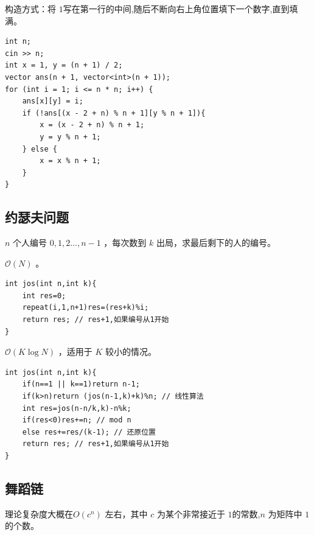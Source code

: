 构造方式：将 $1$写在第一行的中间,随后不断向右上角位置填下一个数字,直到填满。
\begin{lstlisting}[caption={}]
int n;
cin >> n;
int x = 1, y = (n + 1) / 2;
vector ans(n + 1, vector<int>(n + 1));
for (int i = 1; i <= n * n; i++) {
    ans[x][y] = i;
    if (!ans[(x - 2 + n) % n + 1][y % n + 1]){
        x = (x - 2 + n) % n + 1;
        y = y % n + 1;
    } else {
        x = x % n + 1;
    }
}
\end{lstlisting}

\subsection{约瑟夫问题}
$n$ 个人编号 $0,1,2…,n-1$ ，每次数到 $k$ 出局，求最后剩下的人的编号。

$\mathcal O(N)$ 。
\begin{lstlisting}[caption={}]
int jos(int n,int k){
    int res=0;
    repeat(i,1,n+1)res=(res+k)%i;
    return res; // res+1,如果编号从1开始
}
\end{lstlisting}
$\mathcal O(K\log N)$ ，适用于 $K$ 较小的情况。
\begin{lstlisting}[caption={}]
int jos(int n,int k){
    if(n==1 || k==1)return n-1;
    if(k>n)return (jos(n-1,k)+k)%n; // 线性算法
    int res=jos(n-n/k,k)-n%k;
    if(res<0)res+=n; // mod n
    else res+=res/(k-1); // 还原位置
    return res; // res+1,如果编号从1开始
}
\end{lstlisting}


\subsection{舞蹈链}
理论复杂度大概在$O(c^n)$ 左右，其中 $c$ 为某个非常接近于 $1$的常数,$n$ 为矩阵中 $1$的个数。


